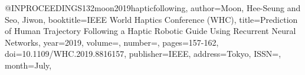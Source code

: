 @INPROCEEDINGS{132moon2019hapticfollowing,
author={Moon, Hee-Seung and Seo, Jiwon},
booktitle={IEEE World Haptics Conference (WHC)}, 
title={Prediction of Human Trajectory Following a Haptic Robotic Guide Using Recurrent Neural Networks}, 
year={2019},
volume={},
number={},
pages={157-162},
doi={10.1109/WHC.2019.8816157},
publisher={IEEE},
address={Tokyo},
ISSN={},
month={July},}